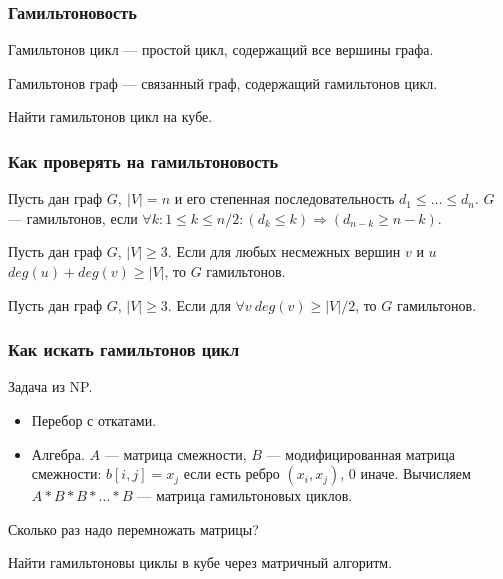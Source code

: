 \documentclass[xcolor=table]{beamer}
\begin{document}
\begin{frame} \frametitle{Гамильтоновость}
  
\begin{definition}
Гамильтонов цикл --- простой цикл, содержащий все вершины графа.
\end{definition}


\begin{definition}
Гамильтонов граф --- связанный граф, содержащий гамильтонов цикл.
\end{definition}

Найти гамильтонов цикл на кубе.

\end{frame}


\begin{frame} \frametitle{Как проверять на гамильтоновость}
  
\begin{theorem}[Хватала]
Пусть дан граф $G, \ |V| = n$ и его степенная последовательность $d_1 \leq \ldots \leq d_n$. $G$ --- гамильтонов, если $\forall k: 1 \leq k \leq n/2 : (d_k \leq k) \Rightarrow (d_{n-k} \geq n-k)$.
\end{theorem}
\pause

\begin{theorem}[Оре]
Пусть дан граф $G$, $|V|\geq 3$. Если для любых несмежных вершин $v$ и $u$ $deg(u) + deg(v) \geq |V|$, то $G$ гамильтонов.
\end{theorem}
\pause

\begin{theorem}[Дирака]
Пусть дан граф $G$, $|V|\geq 3$. Если для $\forall v \ deg(v) \geq |V|/2$, то $G$ гамильтонов.
\end{theorem}


\end{frame}


\begin{frame} \frametitle{Как искать гамильтонов цикл}

Задача из NP.
  
\begin{itemize}
\item Перебор с откатами.
\pause
\item Алгебра. $A$ --- матрица смежности, $B$ --- модифицированная матрица смежности: $b[i,j] = x_j$ если есть ребро $(x_i,x_j)$, 0 иначе.
Вычисляем $A*B*B*\ldots *B$ --- матрица гамильтоновых циклов.
\end{itemize}

Сколько раз надо перемножать матрицы?

Найти гамильтоновы циклы в кубе через матричный алгоритм.



\end{frame}
\end{document}
